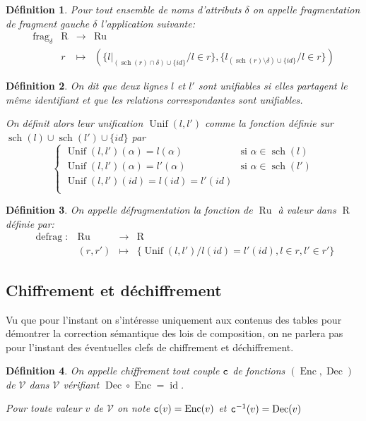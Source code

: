 \documentclass[french]{article}
\DeclareMathOperator{\frag}{frag}
\DeclareMathOperator{\defrag}{defrag}
\DeclareMathOperator{\id}{id}
\DeclareMathOperator{\R}{R}
\DeclareMathOperator{\s}{sch}
\DeclareMathOperator{\ru}{Ru}
\DeclareMathOperator{\uni}{Unif}
\DeclareMathOperator{\enc}{Enc}
\DeclareMathOperator{\dec}{Dec}
\newcommand\typeT[1]{\text{\ttfamily #1}}
\newcommand{\fragDelta}{\frag_{\delta}}
\newcommand{\val}{\mathcal{V}}
\newcommand{\cy}[1]{\typeT{c}(#1)}
\newcommand{\dc}[1]{\typeT{c}^{-1}(#1)}
\newcommand{\cip}{\cup \{id\}}
\newtheorem{defi}{Définition}
\begin{document}
\begin{defi}
	Pour tout ensemble de noms d'attributs $\delta$
	on appelle \emph{fragmentation de fragment gauche $\delta$}
	l'application suivante:
	$$
	\begin{array}{llcl}
	\fragDelta 	& \R & \rightarrow & \ru \\
				& r  & \mapsto & (\{l|_{(\s(r)\cap \delta) \cup \{id\}}/ l \in r \}, 
						\{ l_{(\s(r) \setminus \delta)\cup \{id\}} / l \in r \})
	\end{array}
	$$
\end{defi}

\begin{defi}
	On dit que deux lignes $l$ et $l'$ sont \emph{unifiables}
	si elles partagent le même identifiant
	et que les relations correspondantes sont unifiables.
	
	On définit alors leur unification $\uni(l, l')$ comme la fonction
	définie sur $\s(l) \cup \s(l') \cip$ par
		$$
		\left\lbrace
		\begin{array}{ll}
		\uni(l, l')(\alpha)  = l(\alpha) & \text{si $\alpha \in \s(l) $} \\
		\uni(l, l')(\alpha)  = l'(\alpha) & \text{si $\alpha \in \s(l') $} \\
		\uni(l, l')(id)  = l(id) = l'(id) &  \\
		\end{array}
		\right.
		$$
\end{defi}

\begin{defi}
	On appelle \emph{défragmentation} la fonction
	de $\ru$ à valeur dans $\R$ définie par:
	$$
	\begin{array}{llcl}
	\defrag: & \ru & \rightarrow & \R \\
			& (r, r') & \mapsto & \{ \uni(l, l') / l(id) = l'(id), l\in r, l' \in r' \}
	\end{array}
	$$
\end{defi}

\subsection*{Chiffrement et déchiffrement}
Vu que pour l'instant on s'intéresse uniquement aux contenus des 
tables pour démontrer la correction sémantique des lois
de composition, on ne parlera pas pour l'instant
des éventuelles clefs de chiffrement et déchiffrement.

\begin{defi}
	On appelle \emph{chiffrement} tout couple $\typeT{c}$ de fonctions $(\enc, \dec)$
	de $\val$ dans $\val$
	vérifiant
	$\displaystyle \dec \circ \enc = \id$.
	
	Pour toute valeur $v$ de $\val$
	on note $\cy{v} = \enc(v)$
	et $\dc{v} = \dec(v)$
\end{defi}
\end{document}
